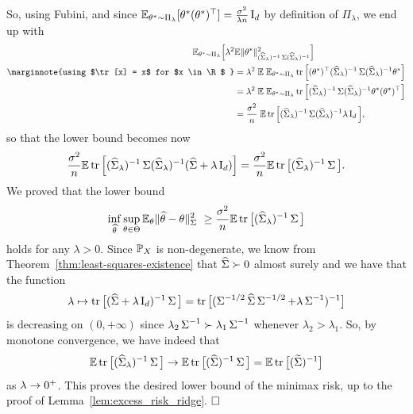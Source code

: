 So, using Fubini, and since $\E_{\theta^* \sim \Pi_\lambda} [\theta^* (\theta^*)^\top] = \frac{\sigma^2}{\lambda n} \bI_d$ by definition of $\Pi_\lambda$, we end up with
\begin{align*}
	\E_{\theta^* \sim \Pi_\lambda} \Big[ \lambda^2 & \E \norm{\theta^*}_{(\wh \bSigma_\lambda)^{-1} 
	\bSigma (\wh \bSigma_\lambda)^{-1}}^2 \Big] \\
	\marginnote{using $\tr[x] = x$ for $x \in \R$ }
	&= \lambda^2 \; \E \; \E_{\theta^* \sim \Pi_\lambda} \tr \Big[ (\theta^*)^\top (\wh \bSigma_\lambda)^{-1} \bSigma (\wh \bSigma_\lambda)^{-1} \theta^* \Big] \\
	&= \lambda^2 \; \E \; \E_{\theta^* \sim \Pi_\lambda} \tr \Big[(\wh \bSigma_\lambda)^{-1} \bSigma (\wh \bSigma_\lambda)^{-1} \theta^*  (\theta^*)^\top \Big] \\
	&= \frac{\sigma^2}{n} \; \E \tr \Big[(\wh \bSigma_\lambda)^{-1} \bSigma (\wh \bSigma_\lambda)^{-1}
	\lambda \bI_d \Big],
\end{align*}
so that the lower bound becomes now
\begin{equation*}
	\frac{\sigma^2}{n} \E \tr \Big[ (\wh \bSigma_\lambda)^{-1} \bSigma (\wh \bSigma_\lambda)^{-1} (\wh \bSigma + \lambda \bI_d) \Big] = \frac{\sigma^2}{n} \E \tr \big[ (\wh \bSigma_\lambda)^{-1} \bSigma \big].
\end{equation*}
We proved that the lower bound
\begin{equation*}
	\inf_{\wh \theta} \sup_{\theta \in \Theta} \E_\theta \norm{\wh \theta - \theta}_{\bSigma}^2 \geq
	\frac{\sigma^2}{n} \E \tr \big[ (\wh \bSigma_\lambda)^{-1} \bSigma \big]
\end{equation*}
holds for any $\lambda > 0$.
Since $\P_X$ is non-degenerate, we know from Theorem~\ref{thm:least-squares-existence} that $\wh \bSigma \succ 0$ almost surely and we have that the function 
\begin{equation*}
	\lambda \mapsto \tr \big[ (\wh \bSigma + \lambda \bI_d)^{-1} \bSigma \big] 
	= \tr \big[ (\bSigma^{-1/2} \wh \bSigma \bSigma^{-1/2} + \lambda \bSigma^{-1})^{-1} \big]
\end{equation*}
is decreasing on $(0, +\infty)$ since $\lambda_2 \bSigma^{-1} \succ \lambda_1 \bSigma^{-1}$ whenever $\lambda_2 > \lambda_1$.
So, by monotone convergence, we have indeed that
\begin{equation*}
	\E \tr \big[ (\wh \bSigma_\lambda)^{-1} \bSigma \big] \go 
	\E \tr \big[ (\wh \bSigma)^{-1} \bSigma \big] = \E \tr \big[ (\wt \bSigma)^{-1} \big]
\end{equation*}
as $\lambda \go 0^+$.
This proves the desired lower bound of the minimax risk, up to the proof of Lemma~\ref{lem:excess_risk_ridge}. $\hfill \square$

